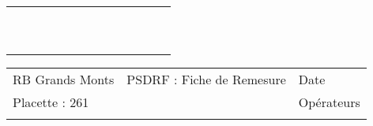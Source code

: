 \documentclass[a4paper, landscape]{article}\usepackage[]{graphicx}\usepackage[]{color}
\begin{document}
{\begin{tabular}{|p{1cm}|p{2cm}|p{1.6cm}|p{1.6cm}|p{1.6cm}|p{1.6cm}|p{1.5cm}|p{1.5cm}|p{1.5cm}|p{1.5cm}|p{1.5cm}|p{7.5cm}|p{5cm}|}
   \hline
 &  &  &  &  &  &  &  &  &  &  &  &  \\ 
   \rowcolor[gray]{0.95} \hline
 &  &  &  &  &  &  &  &  &  &  &  &  \\ 
   \hline
 &  &  &  &  &  &  &  &  &  &  &  &  \\ 
   \rowcolor[gray]{0.95} \hline
 &  &  &  &  &  &  &  &  &  &  &  &  \\ 
   \hline
 &  &  &  &  &  &  &  &  &  &  &  &  \\ 
   \rowcolor[gray]{0.95} \hline
 &  &  &  &  &  &  &  &  &  &  &  &  \\ 
   \hline
 &  &  &  &  &  &  &  &  &  &  &  &  \\ 
   \rowcolor[gray]{0.95} \hline
 &  &  &  &  &  &  &  &  &  &  &  &  \\ 
   \hline
 &  &  &  &  &  &  &  &  &  &  &  &  \\ 
   \rowcolor[gray]{0.95} \hline
 &  &  &  &  &  &  &  &  &  &  &  &  \\ 
   \hline
\end{tabular}
}

\begin{tabular}{p{10cm}p{10cm}p{8cm}}
  RB Grands Monts & PSDRF : Fiche de Remesure & Date \\ 
  Placette : 261 &  & Opérateurs \\ 
   &  &  \\ 
  \end{tabular}
\end{document}
